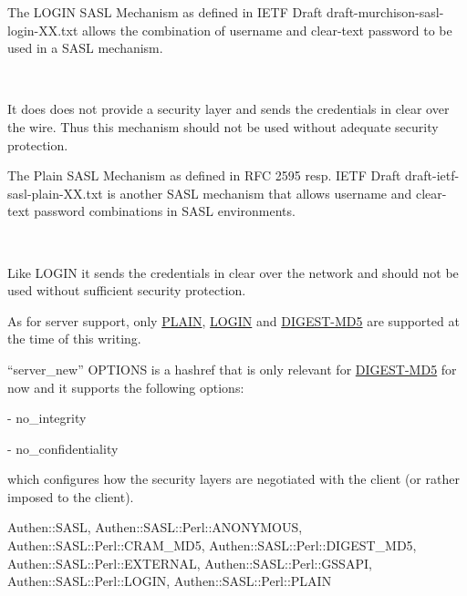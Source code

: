 \documentclass[]{article}
\renewcommand{\emph}[1]{\underline{#1}}
\begin{document}
\begin{description}
\itemsep1pt\parskip0pt
\item[LOGIN]
The LOGIN SASL Mechanism as defined in IETF Draft
draft-murchison-sasl-login-XX.txt allows the combination of username and
clear-text password to be used in a SASL mechanism.

~

It does does not provide a security layer and sends the credentials in
clear over the wire. Thus this mechanism should not be used without
adequate security protection.
\end{description}

\begin{description}
\itemsep1pt\parskip0pt
\item[PLAIN]
The Plain SASL Mechanism as defined in RFC 2595 resp. IETF Draft
draft-ietf-sasl-plain-XX.txt is another SASL mechanism that allows
username and clear-text password combinations in SASL environments.

~

Like LOGIN it sends the credentials in clear over the network and should
not be used without sufficient security protection.
\end{description}

As for server support, only \emph{PLAIN}, \emph{LOGIN} and
\emph{DIGEST-MD5} are supported at the time of this writing.

``server\_new'' OPTIONS is a hashref that is only relevant for
\emph{DIGEST-MD5} for now and it supports the following options:

\begin{description}
\item[- no\_integrity]
\end{description}

\begin{description}
\item[- no\_confidentiality]
\end{description}

which configures how the security layers are negotiated with the client
(or rather imposed to the client).


Authen::SASL, Authen::SASL::Perl::ANONYMOUS,
Authen::SASL::Perl::CRAM\_MD5, Authen::SASL::Perl::DIGEST\_MD5,
Authen::SASL::Perl::EXTERNAL, Authen::SASL::Perl::GSSAPI,
Authen::SASL::Perl::LOGIN, Authen::SASL::Perl::PLAIN
\end{document}
